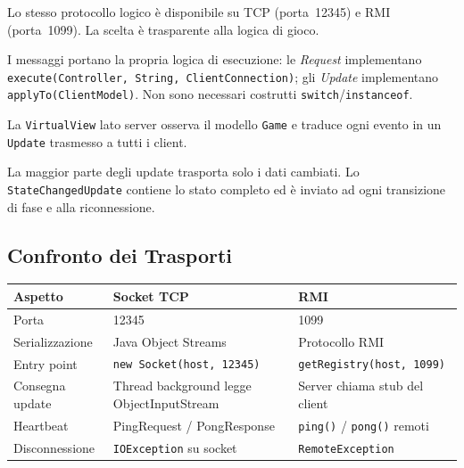 \documentclass[a4paper,12pt]{article}
\newcommand{\code}[1]{\texttt{#1}}
\begin{document}
\begin{description}[leftmargin=2.2cm, labelwidth=2cm]
  \item[\textbf{Dual Transport}]
    Lo stesso protocollo logico è disponibile su TCP (porta~12345) e
    RMI (porta~1099). La scelta è trasparente alla logica di gioco.

  \item[\textbf{Dispatch polimorfico}]
    I messaggi portano la propria logica di esecuzione: le \textit{Request}
    implementano \code{execute(Controller,\,String,\,ClientConnection)};
    gli \textit{Update} implementano \code{applyTo(ClientModel)}.
    Non sono necessari costrutti \code{switch}/\code{instanceof}.

  \item[\textbf{Observer Pattern}]
    La \code{VirtualView} lato server osserva il modello \code{Game} e
    traduce ogni evento in un \code{Update} trasmesso a tutti i client.

  \item[\textbf{Aggiornamenti differenziali}]
    La maggior parte degli update trasporta solo i dati cambiati.
    Lo \code{StateChangedUpdate} contiene lo stato completo ed è inviato
    ad ogni transizione di fase e alla riconnessione.
\end{description}

\subsection{Confronto dei Trasporti}

\begin{tabularx}{\textwidth}{@{}lXX@{}}
\toprule
\textbf{Aspetto} & \textbf{Socket TCP} & \textbf{RMI} \\
\midrule
Porta            & 12345 & 1099 \\
Serializzazione  & Java Object Streams & Protocollo RMI \\
Entry point      & \code{new Socket(host, 12345)} & \code{getRegistry(host,~1099)} \\
Consegna update  & Thread background legge ObjectInputStream & Server chiama stub del client \\
Heartbeat        & PingRequest / PongResponse & \code{ping()} / \code{pong()} remoti \\
Disconnessione   & \code{IOException} su socket & \code{RemoteException} \\
\bottomrule
\end{tabularx}
\end{document}
